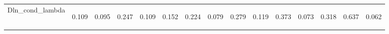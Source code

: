 \begin{center}
\begin{tabular}{lcccccccccccccc}
\noalign{\smallskip}Dln_cond_lambda & \begin{normalsize}0.109\end{normalsize} & \begin{normalsize}0.095\end{normalsize} & \begin{normalsize}0.247\end{normalsize} & \begin{normalsize}0.109\end{normalsize} & \begin{normalsize}0.152\end{normalsize} & \begin{normalsize}0.224\end{normalsize} & \begin{normalsize}0.079\end{normalsize} & \begin{normalsize}0.279\end{normalsize} & \begin{normalsize}0.119\end{normalsize} & \begin{normalsize}0.373\end{normalsize} & \begin{normalsize}0.073\end{normalsize} & \begin{normalsize}0.318\end{normalsize} & \begin{normalsize}0.637\end{normalsize} & \begin{normalsize}0.062\end{normalsize}\\

\end{tabular}
\end{center}
